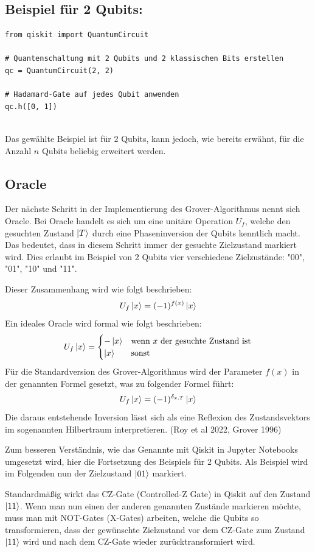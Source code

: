 \subsection*{Beispiel für 2 Qubits:}
\begin{verbatim}
from qiskit import QuantumCircuit

# Quantenschaltung mit 2 Qubits und 2 klassischen Bits erstellen
qc = QuantumCircuit(2, 2)

# Hadamard-Gate auf jedes Qubit anwenden
qc.h([0, 1])


\end{verbatim}


Das gewählte Beispiel ist für 2 Qubits, kann jedoch, wie bereits erwähnt, für die Anzahl $n$ Qubits beliebig erweitert werden.

\subsection*{Oracle}
Der nächste Schritt in der Implementierung des Grover-Algorithmus nennt sich Oracle. Bei Oracle handelt es sich um eine unitäre Operation $U_f$, welche den gesuchten Zustand $\ket{T}$ durch eine Phaseninversion der Qubits kenntlich macht. Das bedeutet, dass in diesem Schritt immer der gesuchte Zielzustand markiert wird. Dies erlaubt im Beispiel von 2 Qubits vier verschiedene Zielzustände: "00", "01", "10" und "11".

Dieser Zusammenhang wird wie folgt beschrieben:
$$
U_f \ket{x} = (-1)^{f(x)} \ket{x}
$$
Ein ideales Oracle wird formal wie folgt beschrieben:
$$
U_f \ket{x} = \begin{cases} -\ket{x} & \text{wenn } x \text{ der gesuchte Zustand ist} \\ \ket{x} & \text{sonst} \end{cases}
$$
Für die Standardversion des Grover-Algorithmus wird der Parameter $f(x)$ in der genannten Formel gesetzt, was zu folgender Formel führt:
$$
U_f \ket{x} = (-1)^{\delta_{x,T}} \ket{x}
$$
Die daraus entstehende Inversion lässt sich als eine Reflexion des Zustandsvektors im sogenannten Hilbertraum interpretieren. (Roy et al 2022, Grover 1996)

Zum besseren Verständnis, wie das Genannte mit Qiskit in Jupyter Notebooks umgesetzt wird, hier die Fortsetzung des Beispiels für 2 Qubits. Als Beispiel wird im Folgenden nun der Zielzustand $\ket{01}$ markiert.

Standardmäßig wirkt das CZ-Gate (Controlled-Z Gate) in Qiskit auf den Zustand $\ket{11}$. Wenn man nun einen der anderen genannten Zustände markieren möchte, muss man mit NOT-Gates (X-Gates) arbeiten, welche die Qubits so transformieren, dass der gewünschte Zielzustand vor dem CZ-Gate zum Zustand $\ket{11}$ wird und nach dem CZ-Gate wieder zurücktransformiert wird.

